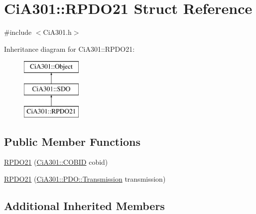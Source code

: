 \hypertarget{struct_ci_a301_1_1_r_p_d_o21}{\section{Ci\-A301\-:\-:R\-P\-D\-O21 Struct Reference}
\label{struct_ci_a301_1_1_r_p_d_o21}
}


{\ttfamily \#include $<$Ci\-A301.\-h$>$}

Inheritance diagram for Ci\-A301\-:\-:R\-P\-D\-O21\-:\begin{figure}[H]
\begin{center}
\leavevmode
\includegraphics[height=3.000000cm]{d0/d44/struct_ci_a301_1_1_r_p_d_o21}
\end{center}
\end{figure}
\subsection*{Public Member Functions}
\begin{DoxyCompactItemize}
\item 
\hyperlink{struct_ci_a301_1_1_r_p_d_o21_ad34e9861335bdd9e370b40ed72987519}{R\-P\-D\-O21} (\hyperlink{namespace_ci_a301_aec5b5dbb2b60d2837c60499f6f297aa7}{Ci\-A301\-::\-C\-O\-B\-I\-D} cobid)
\item 
\hyperlink{struct_ci_a301_1_1_r_p_d_o21_a3e7aa9b557d50fe6efb95af7a608de19}{R\-P\-D\-O21} (\hyperlink{namespace_ci_a301_1_1_p_d_o_a6c7a5941fe4f869dd1703fb7ce7f6549}{Ci\-A301\-::\-P\-D\-O\-::\-Transmission} transmission)
\end{DoxyCompactItemize}
\subsection*{Additional Inherited Members}


